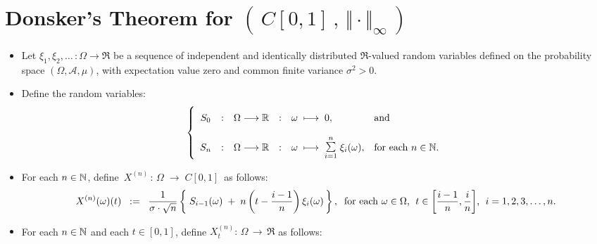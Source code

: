  

\section{Donsker's Theorem for $\left(\,C[0,1]\,,\,\Vert\cdot\Vert_{\infty}\,\right)$}
\setcounter{theorem}{0}
\setcounter{equation}{0}

\renewcommand{\theenumi}{\roman{enumi}}
\renewcommand{\labelenumi}{\textnormal{(\theenumi)}$\;\;$}

\begin{proposition}
\mbox{}\vskip 0cm
\begin{itemize}
\item	Let $\xi_{1}, \xi_{2}, \ldots\, : \Omega \longrightarrow \Re$ be a sequence of
		independent and identically distributed $\Re$-valued random variables
		defined on the probability space $(\Omega,\mathcal{A},\mu)$,
		with expectation value zero and common finite variance $\sigma^{2} > 0$.
\item	Define the random variables:
		\begin{equation*}
		\left\{\begin{array}{ccccll}
		S_{0}
		&:&\overset{{\color{white}1}}{\Omega} \longrightarrow \Re
		&:& \omega \;\longmapsto\; 0,
		& \textnormal{and}
		\\ \\
		S_{n}
		&:&	\Omega \longrightarrow \Re
		&:&	\omega \;\longmapsto\; \overset{n}{\underset{i=1}{\textnormal{\Large$\sum$}}}\;\xi_{i}(\omega),
		& \textnormal{for each $n \in \N$}.
		\end{array}\right.
		\end{equation*}
\item	For each $n \in \mathbb{N}$, define \,$X^{(n)} \,:\, \Omega \;\longrightarrow\;C[0,1]$\, as follows:
		\begin{equation*}
		X^{(n)}(\omega)(t)
		\;\; := \;\;
		\dfrac{1}{\sigma\cdot\sqrt{n}}
		\left\{\;
		S_{i-1}(\omega) \;+\; n\left(t - \dfrac{i-1}{n}\right)\xi_{i}(\omega)
		\,\right\},
		\;\;
		\textnormal{for each $\omega \in \Omega$, \;$t \in \left[\frac{i-1}{n},\frac{i}{n}\right]$, \;$i = 1,2,3,\ldots,n$}.
		\end{equation*}
\item	For each $n \in \mathbb{N}$ and each $t \in [0,1]$, define
		\;$X^{(n)}_{t} : \,\Omega \, \longrightarrow \, \Re$\;
		as follows:
		\begin{equation*}

\end{equation*}
\end{itemize}
\end{proposition}
